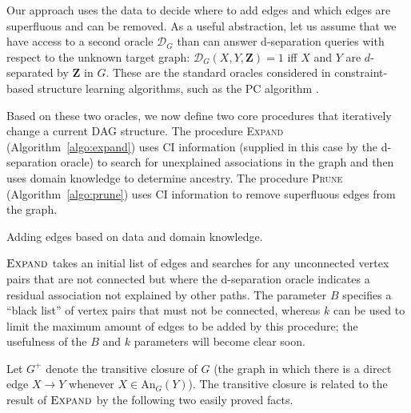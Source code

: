 \documentclass[accepted]{uai2025} %
\begin{document}
Our approach uses the data to decide where to add edges and which edges 
are superfluous and can be removed.
As a useful abstraction, let us assume that we
have access to a second oracle $\mathcal{D}_G$ than can answer d-separation
queries with respect to the unknown target graph:
$\mathcal{D}_G(X,Y,\mathbf{Z})=1$ iff $X$ and $Y$ are $d$-separated by $\mathbf{Z}$ in 
$G$. These are the standard oracles considered in constraint-based structure
learning algorithms, such as the PC algorithm \cite{Spirtes2001}. 

Based on these two oracles, we now define two core procedures that
iteratively change a current DAG structure. The procedure 
\textsc{Expand} (Algorithm~\ref{algo:expand}) uses CI  
information (supplied in this case by the d-separation oracle) 
to search for unexplained associations in the graph and 
then uses domain knowledge to determine ancestry. The 
procedure \textsc{Prune} (Algorithm~\ref{algo:prune}) uses
CI information to remove superfluous edges from the
graph.

\begin{algorithm}[h]
\DontPrintSemicolon
\SetAlgoLined
{}
\caption{Adding edges based on data and domain knowledge.}
\label{algo:expand}
\end{algorithm}

$\textsc{Expand}$ takes an initial list of edges and searches for 
any unconnected vertex pairs that are not connected but where the
d-separation oracle indicates a residual association not explained 
by other paths.
The parameter $B$ specifies a ``black list''
of vertex pairs that must not be connected, 
whereas $k$
can be used to limit the maximum amount of edges 
to be added by this procedure; the usefulness of the $B$ and $k$
parameters will become clear soon.

Let $G^+$ denote the transitive closure of $G$ (the graph in which 
there is a direct edge $X \to Y$ whenever $X \in \textrm{An}_G(Y)$). 
The transitive closure is related to the result of $\textsc{Expand}$ 
by the following two easily proved facts.
\end{document}
